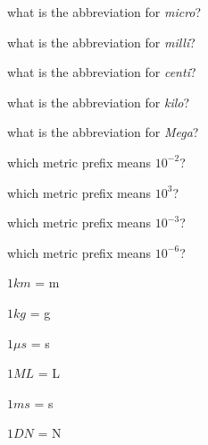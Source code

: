 \documentclass[11pt,addpoints]{exam}  	%
\begin{document}
\begin{questions}
\question[1] what is the abbreviation for \emph{micro}? \fillin[ $\mu$ ]
\vspace{0.2 in}

\question[1] what is the abbreviation for \emph{milli}? \fillin[ $m$ ]
\vspace{0.2 in}

\question[1] what is the abbreviation for \emph{centi}? \fillin[ $c$ ]
\vspace{0.2 in}

\question[1] what is the abbreviation for \emph{kilo}? \fillin[ $k$ ]
\vspace{0.2 in}

\question[1] what is the abbreviation for \emph{Mega}? \fillin[ $M$ ]
\vspace{0.2 in}

\question[1] which metric prefix means $10^{-2}$?  \fillin[centi]
\vspace{0.2 in}

\question[1] which metric prefix means $10^{3}$?  \fillin[kilo]
\vspace{0.2 in}

\question[1] which metric prefix means $10^{-3}$? \fillin[milli]
\vspace{0.2 in}

\question[1] which metric prefix means $10^{-6}$? \fillin[micro]
\vspace{0.2 in}

\question[1] $1 km$ = \fillin[$1000$] m
\vspace{0.2 in}

\question[1] $1 kg$ = \fillin[$1000$] g
\vspace{0.2 in}

\question[1] $1 \mu s$ = \fillin[$0.000001$] s
\vspace{0.2 in}

\question[1] $1 ML$ = \fillin[$1,000,000$] L
\vspace{0.2 in}

\question[1] $1 ms$ = \fillin[$0.001$] s
\vspace{0.2 in}

\question[1] $1 DN$ = \fillin[$10$] N
\end{questions}
\end{document}
